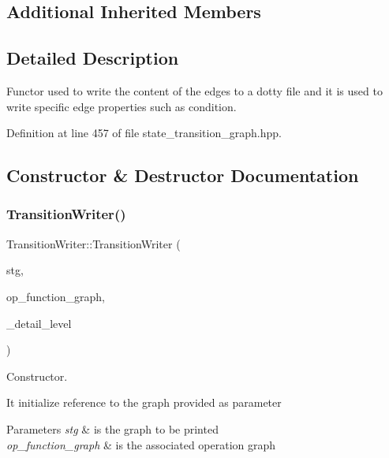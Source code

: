 \subsection*{Additional Inherited Members}


\subsection{Detailed Description}
Functor used to write the content of the edges to a dotty file and it is used to write specific edge properties such as condition. 

Definition at line 457 of file state\+\_\+transition\+\_\+graph.\+hpp.



\subsection{Constructor \& Destructor Documentation}
\mbox{\label{classTransitionWriter_ad7a911971a9d8a0e6f1cf40c324a8862}} 
\subsubsection{\texorpdfstring{Transition\+Writer()}{TransitionWriter()}}
{\footnotesize\ttfamily Transition\+Writer\+::\+Transition\+Writer (\begin{DoxyParamCaption}\item[{const \hyperlink{structgraph}{graph} $\ast$}]{stg,  }\item[{const \hyperlink{op__graph_8hpp_a9a0b240622c47584bee6951a6f5de746}{Op\+Graph\+Const\+Ref}}]{op\+\_\+function\+\_\+graph,  }\item[{int}]{\+\_\+detail\+\_\+level }\end{DoxyParamCaption})}



Constructor. 

It initialize reference to the graph provided as parameter 
\begin{DoxyParams}{Parameters}
{\em stg} & is the graph to be printed \\
\hline
{\em op\+\_\+function\+\_\+graph} & is the associated operation graph \\
\hline
\end{DoxyParams}


